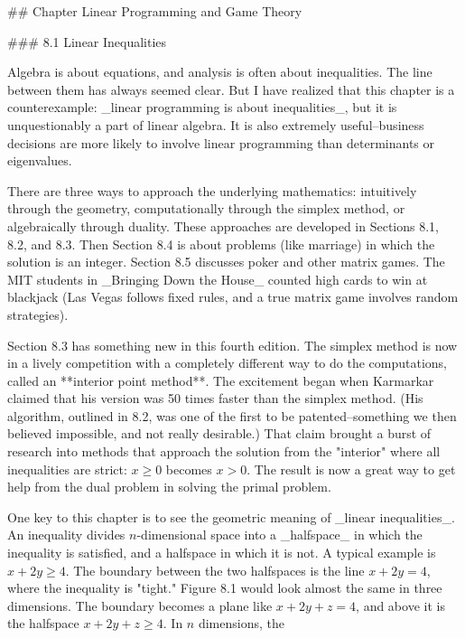 

## Chapter Linear Programming and Game Theory

### 8.1 Linear Inequalities

Algebra is about equations, and analysis is often about inequalities. The line between them has always seemed clear. But I have realized that this chapter is a counterexample: _linear programming is about inequalities_, but it is unquestionably a part of linear algebra. It is also extremely useful--business decisions are more likely to involve linear programming than determinants or eigenvalues.

There are three ways to approach the underlying mathematics: intuitively through the geometry, computationally through the simplex method, or algebraically through duality. These approaches are developed in Sections 8.1, 8.2, and 8.3. Then Section 8.4 is about problems (like marriage) in which the solution is an integer. Section 8.5 discusses poker and other matrix games. The MIT students in _Bringing Down the House_ counted high cards to win at blackjack (Las Vegas follows fixed rules, and a true matrix game involves random strategies).

Section 8.3 has something new in this fourth edition. The simplex method is now in a lively competition with a completely different way to do the computations, called an **interior point method**. The excitement began when Karmarkar claimed that his version was 50 times faster than the simplex method. (His algorithm, outlined in 8.2, was one of the first to be patented--something we then believed impossible, and not really desirable.) That claim brought a burst of research into methods that approach the solution from the "interior" where all inequalities are strict: \(x\geq 0\) becomes \(x>0\). The result is now a great way to get help from the dual problem in solving the primal problem.

One key to this chapter is to see the geometric meaning of _linear inequalities_. An inequality divides \(n\)-dimensional space into a _halfspace_ in which the inequality is satisfied, and a halfspace in which it is not. A typical example is \(x+2y\geq 4\). The boundary between the two halfspaces is the line \(x+2y=4\), where the inequality is "tight." Figure 8.1 would look almost the same in three dimensions. The boundary becomes a plane like \(x+2y+z=4\), and above it is the halfspace \(x+2y+z\geq 4\). In \(n\) dimensions, the